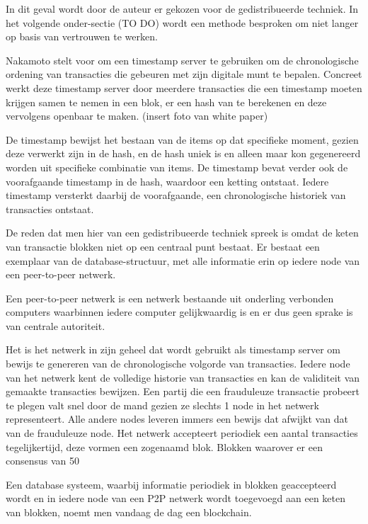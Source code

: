 	In dit geval wordt door de auteur er gekozen voor de gedistribueerde techniek. In het volgende onder-sectie (TO DO) wordt een methode besproken om niet langer op basis van vertrouwen te werken.
	
	Nakamoto stelt voor om een timestamp server te gebruiken om de chronologische ordening van transacties die gebeuren met zijn digitale munt te bepalen.  Concreet werkt deze timestamp server door meerdere transacties die een timestamp moeten krijgen samen te nemen in een blok, er een hash van te berekenen en deze vervolgens openbaar te maken. (insert foto van white paper)
	
	De timestamp bewijst het bestaan van de items op dat specifieke moment, gezien deze verwerkt zijn in de hash, en de hash uniek is en alleen maar kon gegenereerd worden uit specifieke combinatie van items. De timestamp bevat verder ook de voorafgaande timestamp in de hash, waardoor een ketting ontstaat. Iedere timestamp versterkt daarbij de voorafgaande, een chronologische historiek van transacties ontstaat.
	
	De reden dat men hier van een gedistribueerde techniek spreek is omdat de keten van transactie blokken niet op een centraal punt bestaat. Er bestaat een exemplaar van de database-structuur, met alle informatie erin op iedere node van een peer-to-peer netwerk. 
	
	Een peer-to-peer netwerk is een netwerk bestaande uit onderling verbonden computers waarbinnen iedere computer gelijkwaardig is en er dus geen sprake is van centrale autoriteit. 
	
	Het is het netwerk in zijn geheel dat wordt gebruikt als timestamp server om bewijs te genereren van de chronologische volgorde van transacties. Iedere node van het netwerk kent de volledige historie van transacties en kan de validiteit van gemaakte transacties bewijzen. Een partij die een frauduleuze transactie probeert te plegen valt snel door de mand gezien ze slechts 1 node in het netwerk representeert. Alle andere nodes leveren immers een bewijs dat afwijkt van dat van de frauduleuze node. Het netwerk accepteert periodiek een aantal transacties tegelijkertijd, deze vormen een zogenaamd blok. Blokken waarover er een consensus van 50%
	
	Een database systeem, waarbij informatie periodiek in blokken geaccepteerd wordt en in iedere node van een P2P netwerk wordt toegevoegd aan een keten van blokken, noemt men vandaag de dag een blockchain.
	
